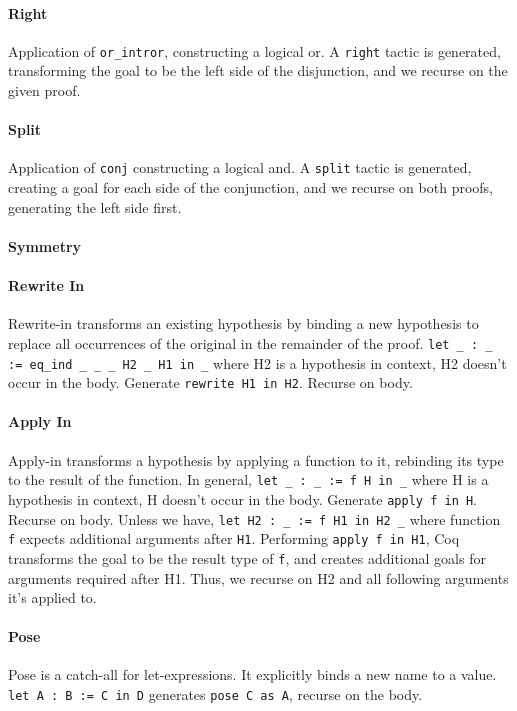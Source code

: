 \paragraph{Right}
Application of \lstinline{or_intror}, constructing a logical or. A \lstinline{right} tactic is generated, transforming the goal to be the left side of the disjunction, and we recurse on the given proof.

\paragraph{Split}
Application of \lstinline{conj} constructing a logical and. A \lstinline{split} tactic is generated, creating a goal for each side of the conjunction, and we recurse on both proofs, generating the left side first.

\paragraph{Symmetry}

\paragraph{Rewrite In}
Rewrite-in transforms an existing hypothesis by binding a new hypothesis to replace all occurrences of the original in the remainder of the proof.
\lstinline{let _ : _ := eq_ind _ _ _ H2 _ H1 in _} where
		H2 is a hypothesis in context,
		H2 doesn’t occur in the body.
		Generate \lstinline{rewrite H1 in H2}. Recurse on body.

\paragraph{Apply In}
Apply-in transforms a hypothesis by applying a function to it, rebinding its type to the result of the function.
		In general,
		\lstinline{let _ : _ := f H in _} where
		H is a hypothesis in context,
		H doesn’t occur in the body.
		Generate  \lstinline{apply f in H}. Recurse on body.
		Unless we have,
		\lstinline{let H2 : _ := f H1 in H2 _} where
function \lstinline{f} expects additional arguments after \lstinline{H1}.
Performing \lstinline{apply f in H1}, Coq transforms the goal to be the result type of \lstinline{f}, and creates additional goals for arguments required after H1. Thus, we recurse on H2 and all following arguments it’s applied to.

\paragraph{Pose}
Pose is a catch-all for let-expressions. It explicitly binds a new name to a value.
\lstinline{let A : B := C in D} generates \lstinline{pose C as A}, recurse on the body.

